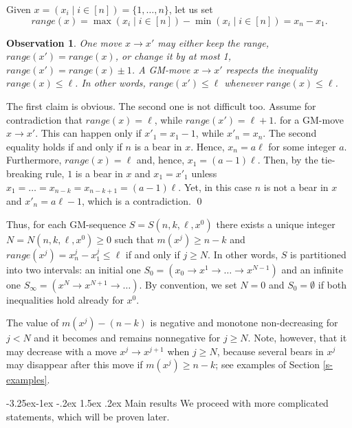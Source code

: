 \documentclass[10pt]{article}
\makeatletter
\renewcommand\subsection{\@startsection{subsection}{2}{\z@}
{-3.25ex\@plus -1ex \@minus -.2ex}
{1.5ex \@plus .2ex}
{\normalfont\normalsize\bfseries\boldmath}}
\newtheorem{observation}{Observation}
\theoremstyle{definition}
\makeatother
\begin{document}
\medskip 

Given $x = (x_i \mid i \in [n]) = \{1, \ldots, n\}$, let us set 
$$range(x) = \max(x_i \mid i \in [n]) - \min(x_i \mid i \in [n]) 
= x_n - x_1.$$ 

\begin{observation}
\label{o4}
One move $x \to x'$ may either keep the range, $range(x') = range(x)$,  
or change it by at most 1, $range(x') = range(x) \pm 1$.   
A GM-move $x \to x'$ respects the inequality 
$range(x) \leq \ell$. 
In other words, 
$range(x') \leq \ell$ whenever $range(x) \leq \ell$. 
\end{observation} 

\proof 
The first claim is obvious. 
The second one is not difficult too. 
Assume for contradiction that 
$range(x) = \ell$, while $range(x') = \ell+1$. 
for a GM-move $x \to x'$. 
This can happen only if 
$x'_1 = x_1 - 1$, while  $x'_n = x_n$. 
The second equality holds 
if and only if  $n$  is a bear in $x$. 
Hence, $x_n = a \ell$  for some integer  $a$. 
Furthermore, $range(x) = \ell$ and, hence, $x_1 = (a-1) \ell$. 
Then, by the tie-breaking rule, 
$1$  is a bear in  $x$  and $x_1 = x'_1$ 
unless $x_1 = \ldots = x_{n-k} = x_{n-k+1} = (a-1) \ell$.  
Yet, in this case $n$ is not a bear in $x$ 
and $x'_n = a \ell-1$, which is a contradiction. 
\qed 

\medskip 

Thus, for each GM-sequence  $S = S(n,k,\ell,x^0)$  
there exists a unique integer   
$N = N(n,k,\ell,x^0) \geq 0$  such that  
$m(x^j) \geq n-k$  and  
$range(x^j) = x_n^j - x_1^j \leq \ell$ 
if and only if  $j \geq N$. 
In other words, $S$  
is partitioned into two intervals: an initial one  
$S_0 = (x_0 \to x^1 \to \ldots \to x^{N-1})$ 
and an infinite one   
$S_\infty = (x^N \to x^{N+1} \to \dots)$. 
By convention, we set $N=0$ and $S_0 = \emptyset$ if 
both inequalities hold already for $x^0$. 

The value of $m(x^j) - (n-k)$ is negative 
and monotone non-decreasing for $j < N$ and 
it becomes and remains nonnegative for $j \geq N$. 
Note, however, that it may decrease 
with a move $x^j \to x^{j+1}$  when $j \geq N$, 
because several bears in $x^j$
may disappear after this move if  $m(x^j) \geq n-k$; 
see examples of Section \ref{s-examples}. 


\subsection{Main results}
\label{ss02} 
We proceed with more complicated statements, 
which will be proven later. 
\end{document}
